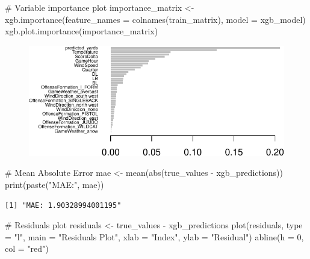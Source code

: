 \documentclass[
  super,
  preprint,
  3p]{elsarticle}
\newenvironment{Shaded}{\begin{snugshade}}{\end{snugshade}}
\newcommand{\AttributeTok}[1]{\textcolor[rgb]{0.40,0.45,0.13}{#1}}
\newcommand{\CommentTok}[1]{\textcolor[rgb]{0.37,0.37,0.37}{#1}}
\newcommand{\DecValTok}[1]{\textcolor[rgb]{0.68,0.00,0.00}{#1}}
\newcommand{\FunctionTok}[1]{\textcolor[rgb]{0.28,0.35,0.67}{#1}}
\newcommand{\NormalTok}[1]{\textcolor[rgb]{0.00,0.23,0.31}{#1}}
\newcommand{\OtherTok}[1]{\textcolor[rgb]{0.00,0.23,0.31}{#1}}
\newcommand{\SpecialCharTok}[1]{\textcolor[rgb]{0.37,0.37,0.37}{#1}}
\newcommand{\StringTok}[1]{\textcolor[rgb]{0.13,0.47,0.30}{#1}}
\begin{document}
\begin{Shaded}
\begin{Highlighting}[]
\CommentTok{\# Variable importance plot}
\NormalTok{importance\_matrix }\OtherTok{\textless{}{-}} \FunctionTok{xgb.importance}\NormalTok{(}\AttributeTok{feature\_names =} \FunctionTok{colnames}\NormalTok{(train\_matrix), }\AttributeTok{model =}\NormalTok{ xgb\_model)}
\FunctionTok{xgb.plot.importance}\NormalTok{(importance\_matrix)}
\end{Highlighting}
\end{Shaded}

\begin{figure}[H]

{\centering \includegraphics{project_report_files/figure-pdf/unnamed-chunk-38-1.pdf}

}

\end{figure}

\begin{Shaded}
\begin{Highlighting}[]
\CommentTok{\# Mean Absolute Error}
\NormalTok{mae }\OtherTok{\textless{}{-}} \FunctionTok{mean}\NormalTok{(}\FunctionTok{abs}\NormalTok{(true\_values }\SpecialCharTok{{-}}\NormalTok{ xgb\_predictions))}
\FunctionTok{print}\NormalTok{(}\FunctionTok{paste}\NormalTok{(}\StringTok{"MAE:"}\NormalTok{, mae))}
\end{Highlighting}
\end{Shaded}

\begin{verbatim}
[1] "MAE: 1.90328994001195"
\end{verbatim}

\begin{Shaded}
\begin{Highlighting}[]
\CommentTok{\# Residuals plot}
\NormalTok{residuals }\OtherTok{\textless{}{-}}\NormalTok{ true\_values }\SpecialCharTok{{-}}\NormalTok{ xgb\_predictions}
\FunctionTok{plot}\NormalTok{(residuals, }\AttributeTok{type =} \StringTok{"l"}\NormalTok{, }\AttributeTok{main =} \StringTok{"Residuals Plot"}\NormalTok{, }\AttributeTok{xlab =} \StringTok{"Index"}\NormalTok{, }\AttributeTok{ylab =} \StringTok{"Residual"}\NormalTok{)}
\FunctionTok{abline}\NormalTok{(}\AttributeTok{h =} \DecValTok{0}\NormalTok{, }\AttributeTok{col =} \StringTok{"red"}\NormalTok{)}
\end{Highlighting}
\end{Shaded}
\end{document}
